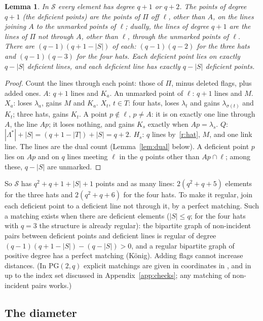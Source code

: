 \documentclass[11pt]{amsart}
\newtheorem{lemma}[theorem]{Lemma}
\theoremstyle{definition}
\theoremstyle{remark}
\newcommand{\cS}{\mathcal{S}}
\newcommand{\lam}{\lambda}
\begin{document}
\begin{lemma}\label{lem:deg}
In $\cS$ every element has degree $q+1$ or $q+2$. The points of degree $q+1$ \textup{(}the \emph{deficient} points\textup{)} are the points of $\Pi$ off $\ell$, other than $A$, on the lines joining $A$ to the unmarked points of $\ell$; dually, the lines of degree $q+1$ are the lines of $\Pi$ not through $A$, other than $\ell$, through the unmarked points of $\ell$. There are $(q-1)(q+1-|S|)$ of each: $(q-1)(q-2)$ for the three hats and $(q-1)(q-3)$ for the four hats. Each deficient point lies on exactly $q-|S|$ deficient lines, and each deficient line has exactly $q-|S|$ deficient points.
\end{lemma}

\begin{proof}
Count the lines through each point: those of $\Pi$, minus deleted flags, plus added ones. $A$: $q+1$ lines and $K_a$. An unmarked point of $\ell$: $q+1$ lines and $M$. $X_a$: loses $\lam_a$, gains $M$ and $K_a$. $X_t$, $t\in T$: four hats, loses $\lam_t$ and gains $\lam_{\sigma(t)}$ and $K_t$; three hats, gains $K_t$. A point $p\notin\ell$, $p\neq A$: it is on exactly one line through $A$, the line $Ap$; it loses nothing, and gains $K_s$ exactly when $Ap=\lam_s$. $Q$: $|\Lambda^*|+|S|=(q+1-|T|)+|S|=q+2$. $H_s$: $q$ lines by~\ref{r:hat}, $M$, and one link line. The lines are the dual count (Lemma~\ref{lem:dual} below). A deficient point $p$ lies on $Ap$ and on $q$ lines meeting $\ell$ in the $q$ points other than $Ap\cap\ell$; among these, $q-|S|$ are unmarked.
\end{proof}

So $\cS$ has $q^2+q+1+|S|+1$ points and as many lines: $2(q^2+q+5)$ elements for the three hats and $2(q^2+q+6)$ for the four hats. To make it regular, join each deficient point to a deficient line not through it, by a perfect matching. Such a matching exists when there are deficient elements ($|S|\le q$; for the four hats with $q=3$ the structure is already regular): the bipartite graph of non-incident pairs between deficient points and deficient lines is regular of degree $(q-1)(q+1-|S|)-(q-|S|)>0$, and a regular bipartite graph of positive degree has a perfect matching (K\"onig). Adding flags cannot increase distances. (In $\mathrm{PG}(2,q)$ explicit matchings are given in coordinates in , and in \cite{AL20} up to the index set discussed in Appendix~\ref{app:checks}; any matching of non-incident pairs works.)

\subsection{The diameter}\label{ssec:diam}
\end{document}
